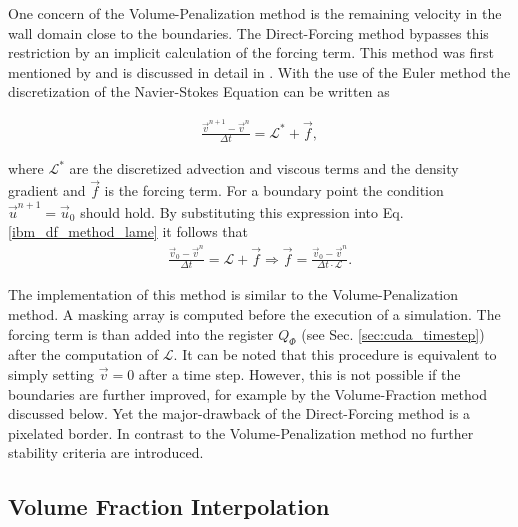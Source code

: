 One concern of the Volume-Penalization method is the remaining velocity in the wall domain close to the boundaries.
The Direct-Forcing method bypasses this restriction by an implicit calculation of the forcing term.
This method was first mentioned by \citep{mohdyusof:1997} and is discussed in detail in \citep{Fadlun2000}.
With the use of the Euler method the discretization of the Navier-Stokes Equation can be written as

\begin{align}
    \label{ibm_df_method_lame}
    \frac{\vec{v}^{n+1} -\vec{v}^n}{\Delta t} = \mathscr{L}^* + \vec{f},
\end{align}

where $\mathscr{L^*}$ are the discretized advection and viscous terms and the density gradient and $\vec{f}$ is the forcing term.
For a boundary point the condition $\vec{u}^{n+1} = \vec{u}_0$ should hold.
By substituting this expression into Eq. \ref{ibm_df_method_lame} it follows that
\begin{align}
    \frac{\vec{v}_0 -\vec{v}^n}{\Delta t} = \mathscr{L} + \vec{f} \Rightarrow \vec{f} = \frac{\vec{v}_0 -\vec{v}^n}{\Delta t\cdot \mathscr{L}}.
\end{align}

The implementation of this method is similar to the Volume-Penalization method.
A masking array is computed before the execution of a simulation.
The forcing term is than added into the register $Q_\Phi$ (see Sec. \ref{sec:cuda_timestep}) after the computation of $\mathscr{L}$.
It can be noted that this procedure is equivalent to simply setting $\vec{v}=0$ after a time step.
However, this is not possible if the boundaries are further improved, for example by the Volume-Fraction method discussed below.
Yet the major-drawback of the Direct-Forcing method is a pixelated border.
In contrast to the Volume-Penalization method no further stability criteria are introduced.

\subsection{Volume Fraction Interpolation}

